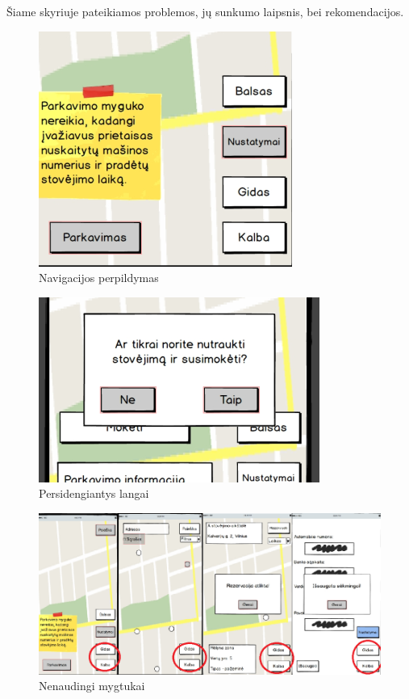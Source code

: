 \documentclass{VUMIFPSkursinis}
\begin{document}
Šiame skyriuje pateikiamos problemos, jų sunkumo laipsnis, bei rekomendacijos.

\begin{figure}[H]
    \centering
    \includegraphics[scale=0.5]{img/def1}
	\caption{Navigacijos perpildymas \label{fig:def1}}
\end{figure}

\begin{figure}[H]
    \centering
    \includegraphics[scale=0.5]{img/def2}
	\caption{Persidengiantys langai \label{fig:def2}}
\end{figure}

\begin{figure}[H]
    \centering
    \includegraphics[scale=0.5]{img/def3}
	\caption{Nenaudingi mygtukai \label{fig:def3}}

\end{figure}
\end{document}

